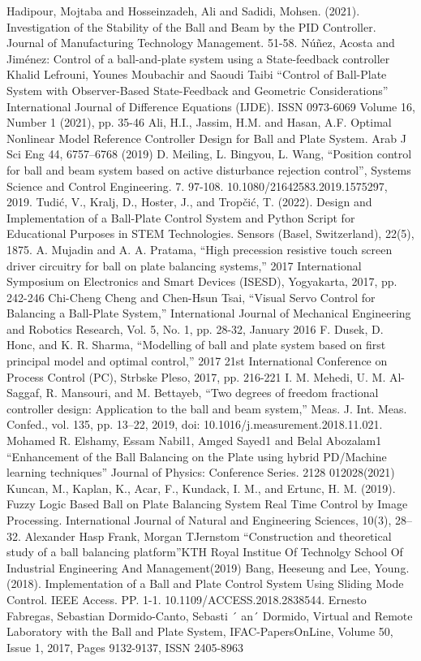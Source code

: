 \documentclass[conference]{IEEEtran}
\begin{document}
\begin{thebibliography}{00}
 Hadipour, Mojtaba and Hosseinzadeh, Ali and Sadidi, Mohsen. (2021). Investigation of the Stability of the Ball and Beam by the PID Controller. Journal of Manufacturing Technology Management. 51-58.
 Núñez, Acosta and Jiménez: Control of a ball-and-plate system using a State-feedback controller
  Khalid Lefrouni, Younes Moubachir and Saoudi Taibi “Control of Ball-Plate System with Observer-Based State-Feedback and Geometric Considerations” International Journal of Difference Equations (IJDE). ISSN 0973-6069 Volume 16, Number 1 (2021), pp. 35-46
Ali, H.I., Jassim, H.M. and Hasan, A.F. Optimal Nonlinear Model Reference Controller Design for Ball and Plate System. Arab J Sci Eng 44, 6757–6768 (2019)
 D. Meiling, L. Bingyou, L. Wang, “Position control for ball and beam system based on active disturbance rejection control”, Systems Science and Control Engineering. 7. 97-108. 10.1080/21642583.2019.1575297, 2019.
 Tudić, V., Kralj, D., Hoster, J., and Tropčić, T. (2022). Design and Implementation of a Ball-Plate Control System and Python Script for Educational Purposes in STEM Technologies. Sensors (Basel, Switzerland), 22(5), 1875. 
 A. Mujadin and A. A. Pratama, “High precession resistive touch screen driver circuitry for ball on plate balancing systems,” 2017 International Symposium on Electronics and Smart Devices (ISESD), Yogyakarta, 2017, pp. 242-246 
 Chi-Cheng Cheng and Chen-Hsun Tsai, “Visual Servo Control for Balancing a Ball-Plate System,” International Journal of Mechanical Engineering and Robotics Research, Vol. 5, No. 1, pp. 28-32, January 2016
 F. Dusek, D. Honc, and K. R. Sharma, “Modelling of ball and plate system based on first principal model and optimal control,” 2017 21st International Conference on Process Control (PC), Strbske Pleso, 2017, pp. 216-221
 I. M. Mehedi, U. M. Al-Saggaf, R. Mansouri, and M. Bettayeb, “Two degrees of freedom fractional controller design: Application to the ball and beam system,” Meas. J. Int. Meas. Confed., vol. 135, pp. 13–22, 2019, doi: 10.1016/j.measurement.2018.11.021. 
 Mohamed R. Elshamy, Essam Nabil1, Amged Sayed1 and Belal Abozalam1 “Enhancement of the Ball Balancing on the Plate using hybrid PD/Machine learning techniques” Journal of Physics: Conference Series. 2128 012028(2021)
 Kuncan, M., Kaplan, K., Acar, F., Kundack, I. M., and Ertunc, H. M. (2019). Fuzzy Logic Based Ball on Plate Balancing System Real Time Control by Image Processing. International Journal of Natural and Engineering Sciences, 10(3), 28–32.
 Alexander Hasp Frank, Morgan TJernstom “Construction and theoretical study of a ball balancing platform”KTH Royal Institue Of Technolgy School Of Industrial Engineering And Management(2019)
 Bang, Heeseung and Lee, Young. (2018). Implementation of a Ball and Plate Control System Using Sliding Mode Control. IEEE Access. PP. 1-1. 10.1109/ACCESS.2018.2838544.
  Ernesto Fabregas, Sebastian Dormido-Canto, Sebasti ´ an´ Dormido, Virtual and Remote Laboratory with the Ball and Plate System, IFAC-PapersOnLine, Volume 50, Issue 1, 2017, Pages 9132-9137, ISSN 2405-8963
\end{thebibliography}
\end{document}
